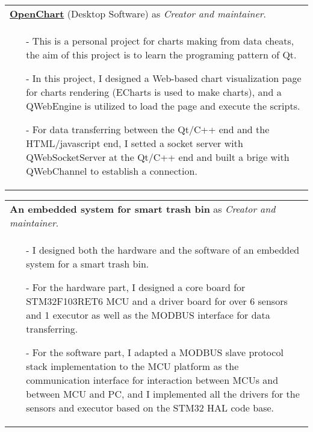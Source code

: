 \documentclass[a4paper,12pt]{article}
\newcommand{\signed}[1]{%
\unskip\nobreak\hfil\penalty50
   \hskip2em\hbox{}\nobreak\hfil#1
   \parfillskip=0pt \finalhyphendemerits=0 }
\begin{document}
\begin{tabularx}{\linewidth}{ @{}X@{} }
    \href{https://github.com/leonezz/OpenChart.git}{\textbf{OpenChart}} (Desktop Software) as \textit{Creator and maintainer}.
    \signed{Jun. 2019 - Dec. 2019} \\[3.75pt]
    \begin{minipage}[t]{\linewidth}
        \begin{itemize}[nosep,after=\strut, leftmargin=1em, itemsep=3pt]
            \item[-] This is a personal project for charts making from data cheats, the aim of this project is to learn the programing pattern of Qt.
            \item[-] In this project, I designed a Web-based chart visualization page for charts rendering (ECharts is used to make charts),
            and a QWebEngine is utilized to load the page and execute the scripts.
            \item[-] For data transferring between the Qt/C++ end and the HTML/javascript end, I setted a socket server with QWebSocketServer
            at the Qt/C++ end and built a brige with QWebChannel to establish a connection.
        \end{itemize}
        \end{minipage}
\end{tabularx}

\begin{tabularx}{\linewidth}{ @{}X@{} }
    \textbf{An embedded system for smart trash bin} as \textit{Creator and maintainer}.
    \signed{Dec. 2020 - May 2021} \\[3.75pt]
    \begin{minipage}[t]{\linewidth}
        \begin{itemize}[nosep,after=\strut, leftmargin=1em, itemsep=3pt]
            \item[-] I designed both the hardware and the software of an embedded system for a smart trash bin.
            \item[-] For the hardware part, I designed a core board for STM32F103RET6 MCU and a driver board for over 6 sensors
            and 1 executor as well as the MODBUS interface for data transferring.
            \item[-] For the software part, I adapted a MODBUS slave protocol stack implementation to the MCU platform as the communication
            interface for interaction between MCUs and between MCU and PC, and I implemented all the drivers for the sensors and executor
            based on the STM32 HAL code base.
        \end{itemize}
        \end{minipage}
\end{tabularx}
\end{document}
